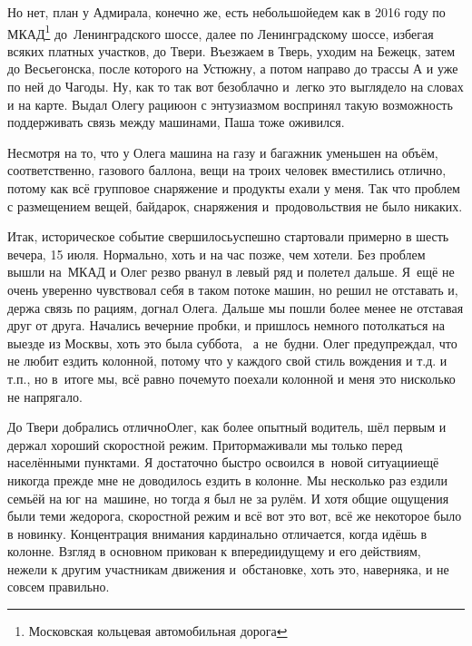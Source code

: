 \renewcommand*{\thefootnote}{\fnsymbol{footnote}}
Но нет, план у Адмирала, конечно же, есть небольшой\mdash едем как в 2016 году по МКАД\footnote[1]{Московская кольцевая автомобильная дорога} до~Ленинградского шоссе, далее по Ленинградскому шоссе, избегая всяких платных участков, до Твери. Въезжаем в Тверь, уходим на Бежецк, затем до Весьегонска, после которого на Устюжну, а потом направо до трассы А и уже по ней до Чагоды. Ну, как то так вот безоблачно и~легко это выглядело на словах и на карте. Выдал Олегу рацию\mdash он с энтузиазмом воспринял такую возможность поддерживать связь между машинами, Паша тоже оживился. 

Несмотря на то, что у Олега машина на газу и багажник уменьшен на объём, соответственно, газового баллона, вещи на троих человек вместились отлично, потому как всё групповое снаряжение и продукты ехали у меня. Так что проблем с размещением вещей, байдарок, снаряжения и~продовольствия не было никаких.

Итак, историческое событие свершилось\mdash успешно стартовали примерно в шесть вечера, 15 июля. Нормально, хоть и на час позже, чем хотели. Без проблем вышли на~МКАД и Олег резво рванул в левый ряд и полетел дальше. Я~ещё не очень уверенно чувствовал себя в таком потоке машин, но решил не отставать и, держа связь по рациям, догнал Олега. Дальше мы пошли более менее не отставая друг от друга. Начались вечерние пробки, и пришлось немного потолкаться на выезде из Москвы, хоть это была суббота, ~а~не~будни. Олег предупреждал, что не любит ездить колонной, потому что у каждого свой стиль вождения и т.д. и т.п., но в~итоге мы, всё равно почему\sdash то поехали колонной и меня это нисколько не напрягало.

До Твери добрались отлично\mdash Олег, как более опытный водитель, шёл первым и держал хороший скоростной режим. Притормаживали мы только перед населёнными пунктами. %
Я достаточно быстро освоился в~новой ситуации\mdash ещё никогда прежде мне не доводилось ездить в колонне. Мы несколько раз ездили семьёй на юг на~машине, но тогда я был не за рулём. И хотя общие ощущения были теми же\mdash дорога, скоростной режим и всё вот это вот, всё же некоторое было в новинку. Концентрация внимания кардинально отличается, когда идёшь в колонне. Взгляд в основном прикован к впередиидущему и его действиям, нежели к другим участникам движения и~обстановке, хоть это, наверняка, и не совсем правильно. 

